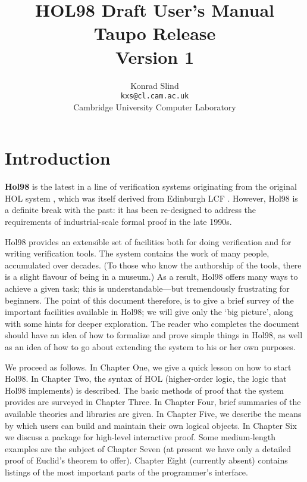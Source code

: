\documentclass[12pt,fleqn,a4paper]{report}
\begin{document}
 \title {HOL98 Draft User's Manual \\ Taupo Release \\ Version 1}
 \author{Konrad Slind \\ {\tt kxs@cl.cam.ac.uk} \\
         Cambridge University Computer Laboratory}
 \maketitle


\section*{Introduction}

 {\bf Hol98} is the latest in a line of verification systems originating
 from the original HOL system \cite{hol88:book}, which was itself
 derived from Edinburgh LCF \cite{lcf:book}. However, Hol98 is a
 definite break with the past: it has been re-designed to address the
 requirements of industrial-scale formal proof in the late 1990s.

 Hol98 provides an extensible set of facilities both for doing
 verification and for writing verification tools. The system contains the
 work of many people, accumulated over decades. (To those who know the
 authorship of the tools, there is a slight flavour of being in a
 museum.) As a result, Hol98 offers many ways to achieve a given task;
 this is understandable---but tremendously frustrating for beginners.
 The point of this document therefore, is to give a brief survey of the
 important facilities available in Hol98; we will give only the `big
 picture', along with some hints for deeper exploration. The reader who
 completes the document should have an idea of how to formalize and prove
 simple things in Hol98, as well as an idea of how to go about extending
 the system to his or her own purposes.

  We proceed as follows. In Chapter One, we give a quick lesson on how
 to start Hol98.  In Chapter Two, the syntax of HOL (higher-order logic,
 the logic that Hol98 implements) is described. The basic methods of
 proof that the system provides are surveyed in Chapter Three. In
 Chapter Four, brief summaries of the available theories and libraries
 are given. In Chapter Five, we describe the means by which users can
 build and maintain their own logical objects. In Chapter Six we discuss
 a package for high-level interactive proof. Some medium-length
 examples are the subject of Chapter Seven (at present we have only a
 detailed proof of Euclid's theorem to offer).  Chapter Eight (currently
 absent) contains listings of the most important parts of the
 programmer's interface.
\end{document}
